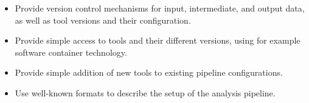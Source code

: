 \begin{itemize} 
    \item Provide version control mechanisms for input, intermediate, and output
        data, as well as tool versions and their configuration.
    \item Provide simple access to tools and their different versions, using for
        example software container technology. 
    \item Provide simple addition of new tools to existing pipeline
        configurations. 
    \item Use well-known formats to describe the setup of the analysis pipeline.
\end{itemize}

